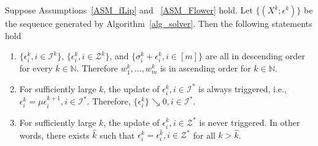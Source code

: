 \documentclass[twoside,11pt]{article}
\newcommand{\Ical}{\mathcal{I}}
\newcommand{\Zcal}{\mathcal{Z}}
\numberwithin{equation}{section}
\begin{document}
 
\begin{theorem} \label{thm.update}
  Suppose Assumptions~\ref{ASM_fLip} and ~\ref{ASM_Flower} hold. Let $\{ (X^{k};\epsilon^{k}) \} $ be the sequence generated by Algorithm~\ref{alg_solver}.   
  Then the following statements hold 
  \begin{enumerate}[label=({\roman*)},leftmargin=*]
    \item  $\{ \epsilon_i^k, i \in \Ical^k\}$, $\{ \epsilon_i^k, i\in \Zcal^k\}$, and $\{\sigma_i^k+\epsilon_i^k, i\in[m]\}$ are all  in   descending order for every $k\in\mathbb{N}$.  Therefore $w_1^k, \ldots, w_m^k$ is in ascending order for $k\in\mathbb{N}$.
    \item For sufficiently large $k$, the update of $\epsilon_i^k, i\in\Ical^*$ is always  triggered, i.e., $\epsilon_i^k = \mu\epsilon_i^{k+1}, i\in\Ical^*$. 
    Therefore,   $\{\epsilon_{i}^{k}\}\searrow 0,i\in\mathcal{I}^{*}$. 
    \item For sufficiently large $k$, the update of $\epsilon_i^k, i\in\Zcal^*$ is never triggered. In other words, there exists $\hat k$ such that 
     $\epsilon_i^k = \epsilon_i^{\hat k}, i\in\Zcal^*$   for all $k > \hat k$. 
  \end{enumerate}
\end{theorem}
\end{document}
